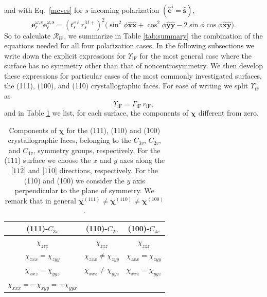 and with Eq.~\eqref{mcves} for $s$ incoming polarization
$(\hat{\mathbf{e}}^{\mathrm{i}} = \hat{\mathbf{s}})$,
\begin{equation}\label{eq:ewewsmr}
\mathbf{e}^{\omega,\mathrm{s}}_{\ell}\mathbf{e}^{\omega,\mathrm{s}}_{\ell}
= \left(t^{v\ell}_{s}r^{M+}_{s}\right)^{2}
\big(
  \sin^{2}\phi\hat{\mathbf{x}}\hat{\mathbf{x}}
 + \cos^{2}\phi\hat{\mathbf{y}}\hat{\mathbf{y}}
 - 2\sin\phi\cos\phi\hat{\mathbf{x}}\hat{\mathbf{y}}
\big).
\end{equation}
So to calculate $\mathcal{R}_{\mathrm{iF}}$, we summarize in Table
\ref{tab:summary} the combination of the equations needed for all four
polarization cases. In the following subsections we write down the explicit
expressions for $\Upsilon_{\mathrm{iF}}$ for the most general case where the
surface has no symmetry other than that of noncentrosymmetry. We then develop
these expressions for particular cases of the most commonly investigated
surfaces, the (111), (100), and (110) crystallographic faces. For ease of
writing we split $\Upsilon_{\mathrm{iF}}$ as
\begin{equation}\label{mc25}
\Upsilon_{\mathrm{iF}} = \Gamma_{\mathrm{iF}}\,r_{\mathrm{iF}},
\end{equation} 
and in Table \ref{chis} we list,  for each surface, the components of
$\boldsymbol{\chi}$ different from 
zero.\cite{sipePRB87, popov95}
\begin{table}[t]
\begin{tabular}{|c|c|c|}
\hline 
(111)-$C_{3v}$     & (110)-$C_{2v}$  & (100)-$C_{4v}$ \\
\hline 
$\chi_{zzz}$ & $\chi_{zzz}$ & $\chi_{zzz}$\\
$\chi_{zxx}=\chi_{zyy}$ & $\chi_{zxx}\ne\chi_{zyy}$ & $\chi_{zxx}=\chi_{zyy}$\\
$\chi_{xxz}=\chi_{yyz}$ & $\chi_{xxz}\ne\chi_{yyz}$ & $\chi_{xxz}=\chi_{yyz}$\\
$\chi_{xxx}=-\chi_{xyy}=-\chi_{yyx}$ & &  \\
\hline 
\end{tabular}
\caption{Components of $\boldsymbol{\chi}$ for the (111), (110) and
  (100) crystallographic faces, belonging to the 
$C_{3v}$, 
$C_{2v}$, and
$C_{4v}$, symmetry groups, respectively. 
For the (111) surface we choose the $x$ and $y$ axes along 
the [$11\bar{2}$] and [$1\bar{1}0$] directions, respectively.
For the (110) and (100) we consider the $y$ axis perpendicular to the
plane of symmetry.\cite{sipePRB87}
We remark that in general
$\boldsymbol{\chi}^{(111)}\ne \boldsymbol{\chi}^{(110)}
\ne \boldsymbol{\chi}^{(100)}$.
}
\label{chis}
\end{table}

